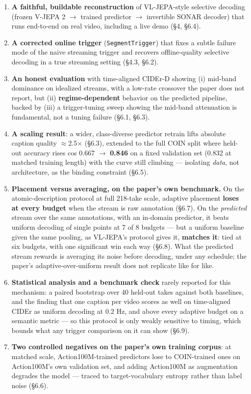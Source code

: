 \begin{enumerate}
\item \textbf{A faithful, buildable reconstruction} of VL-JEPA-style selective decoding (frozen V-JEPA 2 $\rightarrow$ trained predictor $\rightarrow$ invertible SONAR decoder) that runs end-to-end on real video, including a live demo (\S4, \S6.4).
\item \textbf{A corrected online trigger} (\texttt{SegmentTrigger}) that fixes a subtle failure mode of the naive streaming trigger and recovers offline-quality selective decoding in a true streaming setting (\S4.3, \S6.2).
\item \textbf{An honest evaluation} with time-aligned CIDEr-D showing (i) mid-band dominance on idealized streams, with a low-rate crossover the paper does not report, but (ii) \textbf{regime-dependent} behavior on the predicted pipeline, backed by (iii) a trigger-tuning sweep showing the mid-band attenuation is fundamental, not a tuning failure (\S6.1, \S6.3).
\item \textbf{A scaling result}: a wider, class-diverse predictor retrain lifts absolute caption quality $\approx$2.5$\times$ (\S6.3), extended to the full COIN split where held-out accuracy rises cos 0.667 $\rightarrow$ \textbf{0.846} on a fixed validation set (0.832 at matched training length) with the curve still climbing --- isolating \emph{data}, not architecture, as the binding constraint (\S6.5).
\item \textbf{Placement versus averaging, on the paper's own benchmark.} On the atomic-description protocol at full 218-take scale, adaptive placement \textbf{loses at every budget} when the stream is raw annotation (\S6.7). On the \emph{predicted} stream over the same annotations, with an in-domain predictor, it beats uniform decoding of single points at 7 of 8 budgets --- but a uniform baseline given the same pooling, as VL-JEPA's protocol gives it, \textbf{matches it}: tied at six budgets, with one significant win each way (\S6.8). What the predicted stream rewards is averaging its noise before decoding, under any schedule; the paper's adaptive-over-uniform result does not replicate like for like.
\item \textbf{Statistical analysis and a benchmark check} rarely reported for this mechanism: a paired bootstrap over 40 held-out takes against both baselines, and the finding that one caption per video scores as well on time-aligned CIDEr as uniform decoding at 0.2 Hz, and above every adaptive budget on a semantic metric --- so this protocol is only weakly sensitive to timing, which bounds what any trigger comparison on it can show (\S6.9).
\item \textbf{Two controlled negatives on the paper's own training corpus}: at matched scale, Action100M-trained predictors lose to COIN-trained ones on Action100M's own validation set, and adding Action100M as augmentation degrades the model --- traced to target-vocabulary entropy rather than label noise (\S6.6).
\end{enumerate}

